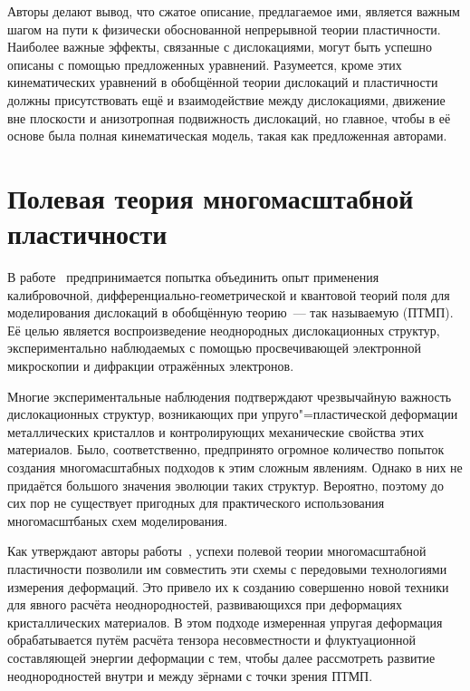 \documentclass[a4paper, 14pt, titlepage]{extarticle}
\begin{document}
  Авторы делают вывод, что сжатое описание, предлагаемое ими, является важным шагом на пути к
  физически обоснованной непрерывной теории пластичности. Наиболее важные эффекты, связанные с
  дислокациями, могут быть успешно описаны с помощью предложенных уравнений. Разумеется, кроме
  этих кинематических уравнений в обобщённой теории дислокаций и пластичности должны
  присутствовать ещё и взаимодействие между дислокациями, движение вне плоскости и анизотропная
  подвижность дислокаций, но главное, чтобы в её основе была полная кинематическая модель, такая как
  предложенная авторами.

  \section{Полевая теория многомасштабной пластичности}

  В работе~\cite{hasebe-ftmp} предпринимается попытка объединить опыт применения калибровочной,
  дифференциально-геометрической и квантовой теорий поля для моделирования дислокаций в обобщённую
  теорию~--- так называемую  (ПТМП). Её целью
  является воспроизведение неоднородных дислокационных структур, экспериментально наблюдаемых с
  помощью просвечивающей электронной микроскопии и дифракции отражённых электронов.

  Многие экспериментальные наблюдения подтверждают чрезвычайную важность дислокационных структур,
  возникающих при упруго"=пластической деформации металлических кристаллов и контролирующих
  механические свойства этих материалов. Было, соответственно, предпринято огромное количество
  попыток создания многомасштабных подходов к этим сложным явлениям. Однако в них не придаётся
  большого значения эволюции таких структур. Вероятно, поэтому до сих пор не существует пригодных
  для практического использования многомасштбаных схем моделирования.

  Как утверждают авторы работы~\cite{hasebe-ftmp}, успехи полевой теории многомасштабной
  пластичности позволили им совместить эти схемы с передовыми технологиями измерения деформаций. Это
  привело их к созданию совершенно новой техники для явного расчёта неоднородностей, развивающихся
  при деформациях кристаллических материалов. В этом подходе измеренная упругая деформация
  обрабатывается путём расчёта тензора несовместности и флуктуационной составляющей энергии
  деформации с тем, чтобы далее рассмотреть развитие неоднородностей внутри и между зёрнами с точки
  зрения ПТМП.
\end{document}
